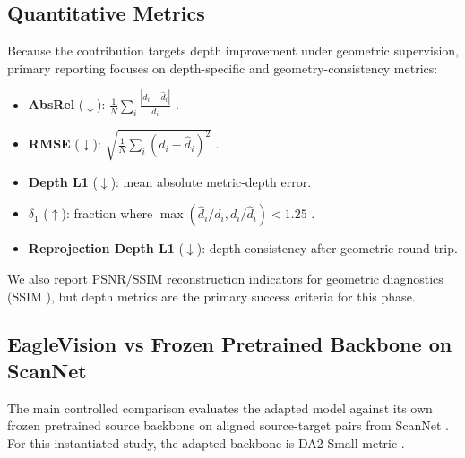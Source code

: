 \documentclass{article}
\begin{document}
\subsection{Quantitative Metrics}
Because the contribution targets depth improvement under geometric supervision, primary reporting focuses on depth-specific and geometry-consistency metrics:
\begin{itemize}
  \item \textbf{AbsRel} ($\downarrow$): $\frac{1}{N}\sum_i \frac{|d_i-\hat{d}_i|}{d_i}$ \cite{eigen2014depth}.
  \item \textbf{RMSE} ($\downarrow$): $\sqrt{\frac{1}{N}\sum_i(d_i-\hat{d}_i)^2}$ \cite{eigen2014depth}.
  \item \textbf{Depth L1} ($\downarrow$): mean absolute metric-depth error.
  \item \textbf{$\delta_1$} ($\uparrow$): fraction where $\max(\hat{d}_i/d_i, d_i/\hat{d}_i) < 1.25$ \cite{eigen2014depth}.
  \item \textbf{Reprojection Depth L1} ($\downarrow$): depth consistency after geometric round-trip.
\end{itemize}
We also report PSNR/SSIM reconstruction indicators for geometric diagnostics (SSIM \cite{wang2004ssim}), but depth metrics are the primary success criteria for this phase.

\subsection{EagleVision vs Frozen Pretrained Backbone on ScanNet}
The main controlled comparison evaluates the adapted model against its own frozen pretrained source backbone on aligned source-target pairs from ScanNet \cite{dai2017scannet}. For this instantiated study, the adapted backbone is DA2-Small metric \cite{yang2024depthanythingv2}.

\begin{table}[t]
\caption{ScanNet-domain paired evaluation on 433 aligned source-target pairs.}
\label{tab:paired_eval}
\centering
\small
{}
\end{table}
\end{document}
